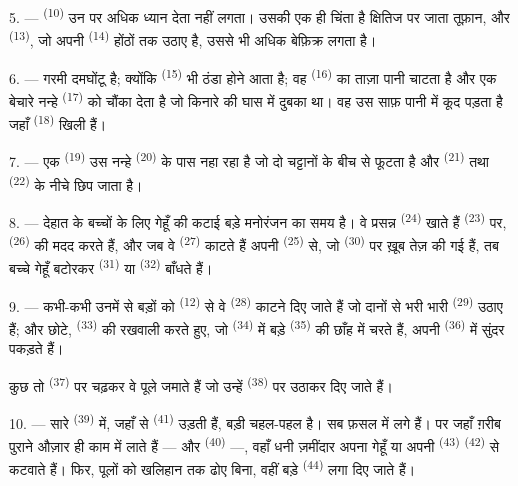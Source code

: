 5. ---  \textsuperscript{(10)} उन पर अधिक ध्यान देता नहीं लगता।
उसकी एक ही चिंता है क्षितिज पर जाता तूफ़ान, और 
\textsuperscript{(13)}, जो अपनी  \textsuperscript{(14)} होंठों तक
उठाए है, उससे भी अधिक बेफ़िक्र लगता है।

6. --- गरमी दमघोंटू है; क्योंकि  \textsuperscript{(15)} भी ठंडा
होने आता है; वह  \textsuperscript{(16)} का ताज़ा पानी चाटता है और
एक बेचारे नन्हे  \textsuperscript{(17)} को चौंका देता है जो किनारे
की घास में दुबका था। वह उस साफ़ पानी में कूद पड़ता है जहाँ
 \textsuperscript{(18)} खिली हैं।

7. --- एक  \textsuperscript{(19)} उस नन्हे 
\textsuperscript{(20)} के पास नहा रहा है जो दो चट्टानों के बीच से फूटता है और
 \textsuperscript{(21)} तथा 
\textsuperscript{(22)} के नीचे छिप जाता है।

\VUsaut{5.0mm}
\VUsaut{3.4mm}

8. --- देहात के बच्चों के लिए गेहूँ की कटाई बड़े मनोरंजन का समय है। वे प्रसन्न
 \textsuperscript{(24)} खाते हैं 
\textsuperscript{(23)} पर,  \textsuperscript{(26)} की मदद
करते हैं, और जब वे  \textsuperscript{(27)} काटते हैं अपनी
 \textsuperscript{(25)} से, जो 
\textsuperscript{(30)} पर ख़ूब तेज़ की गई हैं, तब बच्चे गेहूँ बटोरकर
 \textsuperscript{(31)} या  \textsuperscript{(32)}
बाँधते हैं।

9. --- कभी-कभी उनमें से बड़ों को  \textsuperscript{(12)} से वे
 \textsuperscript{(28)} काटने दिए जाते हैं जो दानों से भरी
भारी  \textsuperscript{(29)} उठाए हैं; और छोटे, 
\textsuperscript{(33)} की रखवाली करते हुए, जो 
\textsuperscript{(34)} में बड़े  \textsuperscript{(35)} की
छाँह में चरते हैं, अपनी  \textsuperscript{(36)} में सुंदर 
पकड़ते हैं।

कुछ तो  \textsuperscript{(37)} पर चढ़कर वे पूले जमाते हैं जो उन्हें
 \textsuperscript{(38)} पर उठाकर दिए जाते हैं।

10. --- सारे  \textsuperscript{(39)} में, जहाँ से 
\textsuperscript{(41)} उड़ती हैं, बड़ी चहल-पहल है। सब फ़सल में लगे हैं। पर जहाँ
ग़रीब पुराने औज़ार ही काम में लाते हैं —  और
 \textsuperscript{(40)} —, वहाँ धनी ज़मींदार अपना गेहूँ या अपनी
 \textsuperscript{(43)}  \textsuperscript{(42)} से
कटवाते हैं। फिर, पूलों को खलिहान तक ढोए बिना, वहीं बड़े 
\textsuperscript{(44)} लगा दिए जाते हैं।

